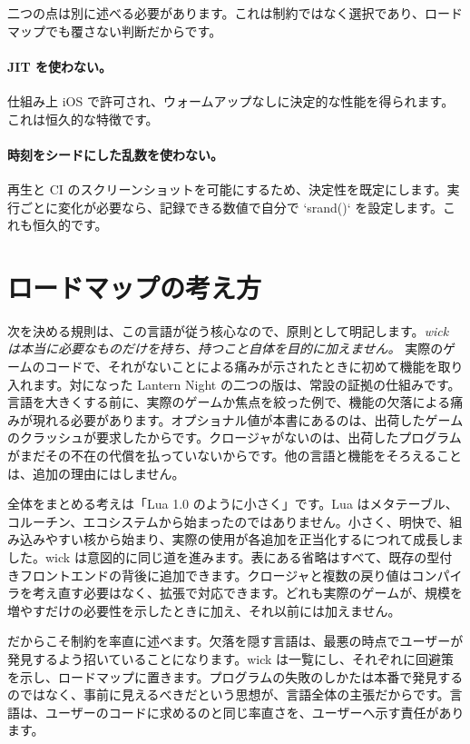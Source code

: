 \noindent
二つの点は別に述べる必要があります。これは制約ではなく選択であり、ロードマップでも覆さない判断だからです。

\paragraph{JIT を使わない。} 仕組み上 iOS で許可され、ウォームアップなしに決定的な性能を得られます。これは恒久的な特徴です。

\paragraph{時刻をシードにした乱数を使わない。} 再生と CI のスクリーンショットを可能にするため、決定性を既定にします。実行ごとに変化が必要なら、記録できる数値で自分で `srand()` を設定します。これも恒久的です。

\section{ロードマップの考え方}

次を決める規則は、この言語が従う核心なので、原則として明記します。\emph{wick は本当に必要なものだけを持ち、持つこと自体を目的に加えません。} 実際のゲームのコードで、それがないことによる痛みが示されたときに初めて機能を取り入れます。対になった Lantern Night の二つの版は、常設の証拠の仕組みです。言語を大きくする前に、実際のゲームか焦点を絞った例で、機能の欠落による痛みが現れる必要があります。オプショナル値が本書にあるのは、出荷したゲームのクラッシュが要求したからです。クロージャがないのは、出荷したプログラムがまだその不在の代償を払っていないからです。他の言語と機能をそろえることは、追加の理由にはしません。

全体をまとめる考えは「Lua 1.0 のように小さく」です。Lua はメタテーブル、コルーチン、エコシステムから始まったのではありません。小さく、明快で、組み込みやすい核から始まり、実際の使用が各追加を正当化するにつれて成長しました。wick は意図的に同じ道を進みます。表にある省略はすべて、既存の型付きフロントエンドの背後に追加できます。クロージャと複数の戻り値はコンパイラを考え直す必要はなく、拡張で対応できます。どれも実際のゲームが、規模を増やすだけの必要性を示したときに加え、それ以前には加えません。

だからこそ制約を率直に述べます。欠落を隠す言語は、最悪の時点でユーザーが発見するよう招いていることになります。wick は一覧にし、それぞれに回避策を示し、ロードマップに置きます。プログラムの失敗のしかたは本番で発見するのではなく、事前に見えるべきだという思想が、言語全体の主張だからです。言語は、ユーザーのコードに求めるのと同じ率直さを、ユーザーへ示す責任があります。
